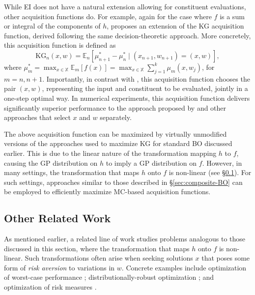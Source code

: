 \documentclass{wscpaperproc}
\newcommand{\E}{\mathbb{E}}
\newcommand{\X}{\mathbb{X}}
\newcommand{\KG}{\mathrm{KG}}
\theoremstyle{wsc}
\begin{document}
While EI does not have a natural extension allowing for constituent evaluations, other acquisition functions do.  For example, again for the case where $f$ is a sum or integral of the components of $h$,  proposes an extension of the KG acquisition function, derived following the same decision-theoretic approach. More concretely, this acquisition function is defined as
\begin{equation*}
    \KG_n(x,w) = \E_n\left[\mu_{n+1}^* - \mu_n^*\mid(x_{n+1}, w_{n+1})=(x,w)\right],
\end{equation*}
where $\mu_m^* = \max_{x\in\X}\E_m[f(x)]=    \max_{x\in\X}\sum_{j=1}^k\mu_m(x, w_j)$,
for $m=n, n+1$. Importantly, in contrast with , this acquisition function chooses the pair $(x,w)$, representing the input and constituent to be evaluated, jointly in a one-step optimal way. In numerical experiments, this acquisition function delivers significantly superior performance to the approach proposed by  and other approaches that select $x$ and $w$ separately.

The above acquisition function can be maximized by virtually unmodified versions of the approaches used to maximize KG for standard BO discussed earlier. This is due to the linear nature of the transformation mapping $h$ to $f$, causing the GP distribution on $h$ to imply a GP distribution on $f$. However, in many settings, the transformation that maps $h$ onto $f$ is non-linear (see \S\ref{sec:constituent-BO-other}). For such settings, approaches similar to those described in 
\S\ref{sec:composite-BO} can be employed to efficiently maximize MC-based acquisition functions.
\subsection{Other Related Work}
\label{sec:constituent-BO-other}
 As mentioned earlier, a related line of work studies problems analogous to those discussed in this section, where the transformation that maps  $h$ onto $f$ is non-linear. Such transformations often arise when seeking solutions $x$ that poses some form of \textit{risk aversion} to variations in $w$. Concrete examples include optimization of worst-case performance  ; distributionally-robust optimization ; and optimization of risk measures .
 
\end{document}
